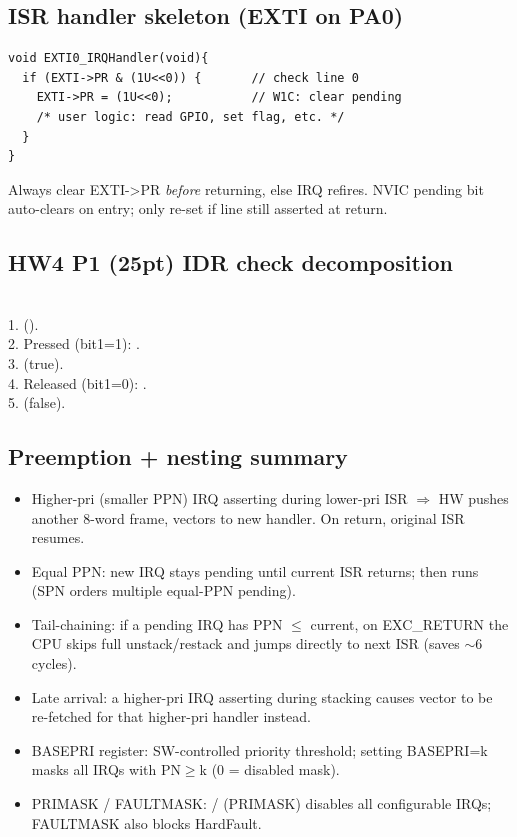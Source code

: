 \subsection{ISR handler skeleton (EXTI on PA0)}
\begin{lstlisting}[language={}]
void EXTI0_IRQHandler(void){
  if (EXTI->PR & (1U<<0)) {       // check line 0
    EXTI->PR = (1U<<0);           // W1C: clear pending
    /* user logic: read GPIO, set flag, etc. */
  }
}
\end{lstlisting}
Always clear EXTI->PR \emph{before} returning, else IRQ refires. NVIC pending bit auto-clears on entry; only re-set if line still asserted at return.

\subsection{HW4 P1 (25pt) IDR check decomposition}
\\
1.  ().\\
2. Pressed (bit1=1): .\\
3.  (true).\\
4. Released (bit1=0): .\\
5.  (false).

\subsection{Preemption + nesting summary}
\begin{itemize}
\item Higher-pri (smaller PPN) IRQ asserting during lower-pri ISR $\Rightarrow$ HW pushes another 8-word frame, vectors to new handler. On return, original ISR resumes.
\item Equal PPN: new IRQ stays pending until current ISR returns; then runs (SPN orders multiple equal-PPN pending).
\item Tail-chaining: if a pending IRQ has PPN $\leq$ current, on EXC\_RETURN the CPU skips full unstack/restack and jumps directly to next ISR (saves $\sim$6 cycles).
\item Late arrival: a higher-pri IRQ asserting during stacking causes vector to be re-fetched for that higher-pri handler instead.
\item BASEPRI register: SW-controlled priority threshold; setting BASEPRI=k masks all IRQs with PN$\geq$k (0 = disabled mask).
\item PRIMASK / FAULTMASK:  /  (PRIMASK) disables all configurable IRQs; FAULTMASK also blocks HardFault.
\end{itemize}

